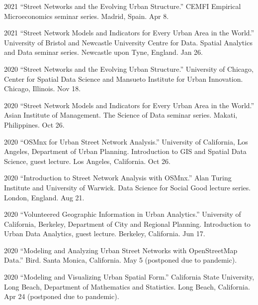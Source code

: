 \documentclass[12pt,letterpaper]{report}
\begin{document}
    \begin{tablist}

        \item[2021] \tab \enquote{Street Networks and the Evolving Urban Structure.} CEMFI Empirical Microeconomics seminar series. Madrid, Spain. Apr 8.

        \item[2021] \tab \enquote{Street Network Models and Indicators for Every Urban Area in the World.} University of Bristol and Newcastle University Centre for Data. Spatial Analytics and Data seminar series. Newcastle upon Tyne, England. Jan 26.

        \item[2020] \tab \enquote{Street Networks and the Evolving Urban Structure.} University of Chicago, Center for Spatial Data Science and Mansueto Institute for Urban Innovation. Chicago, Illinois. Nov 18.

        \item[2020] \tab \enquote{Street Network Models and Indicators for Every Urban Area in the World.} Asian Institute of Management. The Science of Data seminar series. Makati, Philippines. Oct 26.

        \item[2020] \tab \enquote{OSMnx for Urban Street Network Analysis.} University of California, Los Angeles, Department of Urban Planning. Introduction to GIS and Spatial Data Science, guest lecture. Los Angeles, California. Oct 26.

        \item[2020] \tab \enquote{Introduction to Street Network Analysis with OSMnx.} Alan Turing Institute and University of Warwick. Data Science for Social Good lecture series. London, England. Aug 21.

        \item[2020] \tab \enquote{Volunteered Geographic Information in Urban Analytics.} University of California, Berkeley, Department of City and Regional Planning. Introduction to Urban Data Analytics, guest lecture. Berkeley, California. Jun 17.

        \item[2020] \tab \enquote{Modeling and Analyzing Urban Street Networks with OpenStreetMap Data.} Bird. Santa Monica, California. May 5 (postponed due to pandemic).

        \item[2020] \tab \enquote{Modeling and Visualizing Urban Spatial Form.} California State University, Long Beach, Department of Mathematics and Statistics. Long Beach, California. Apr 24 (postponed due to pandemic).


\end{tablist}
\end{document}
